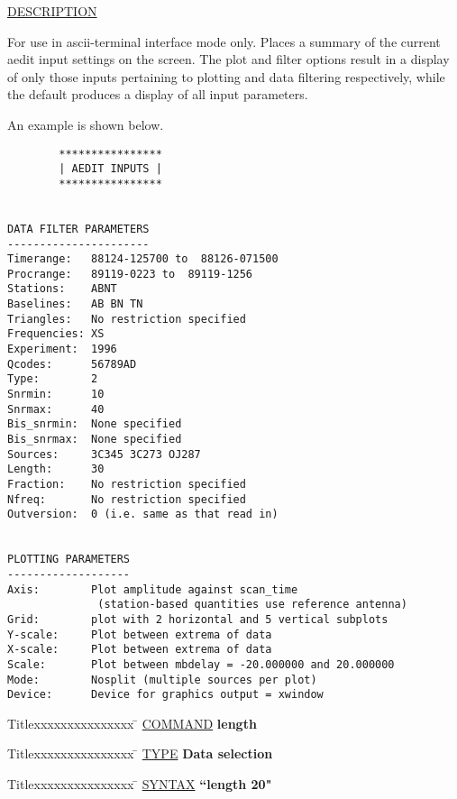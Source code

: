 \underline{DESCRIPTION}
\begin{list}{}{\setlength{\leftmargin}{0.5in}
     \setlength{\rightmargin}{0in}}
\item
For use in ascii-terminal interface mode only.  Places a
summary of the current aedit input settings on the screen.
The plot and filter options result in a display of only 
those inputs pertaining to plotting and data filtering
respectively, while the default produces a display of all
input parameters.
\item
An example is shown below.
\item
\begin{verbatim}
        ****************
        | AEDIT INPUTS |
        ****************


DATA FILTER PARAMETERS
----------------------
Timerange:   88124-125700 to  88126-071500
Procrange:   89119-0223 to  89119-1256
Stations:    ABNT
Baselines:   AB BN TN 
Triangles:   No restriction specified
Frequencies: XS
Experiment:  1996
Qcodes:      56789AD
Type:        2
Snrmin:      10
Snrmax:      40
Bis_snrmin:  None specified
Bis_snrmax:  None specified
Sources:     3C345 3C273 OJ287
Length:      30 
Fraction:    No restriction specified
Nfreq:       No restriction specified
Outversion:  0 (i.e. same as that read in)


PLOTTING PARAMETERS
-------------------
Axis:        Plot amplitude against scan_time
              (station-based quantities use reference antenna)
Grid:        plot with 2 horizontal and 5 vertical subplots
Y-scale:     Plot between extrema of data
X-scale:     Plot between extrema of data
Scale:       Plot between mbdelay = -20.000000 and 20.000000
Mode:        Nosplit (multiple sources per plot)
Device:      Device for graphics output = xwindow
\end{verbatim}
\end{list}
\vspace{.2in}

\begin{tabbing}
Titlexxxxxxxxxxxxxxx \= \kill
\underline{COMMAND} \> {\bf 	length} \\
\end{tabbing}

\begin{tabbing}
Titlexxxxxxxxxxxxxxx \= \kill
\underline{TYPE} \> {\bf 		Data selection} \\
\end{tabbing}

\begin{tabbing}
Titlexxxxxxxxxxxxxxx \= \kill
\underline{SYNTAX} \> {\bf 		``length 20"} \\
\end{tabbing}

